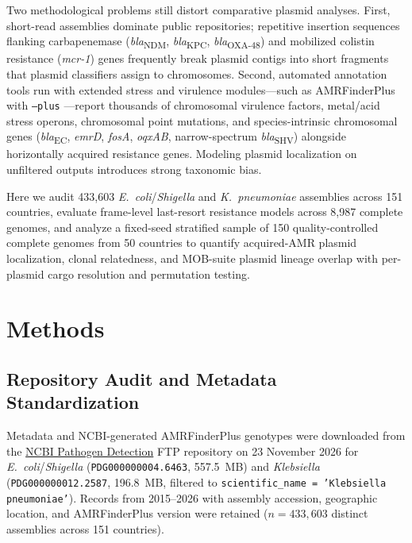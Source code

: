 \documentclass[11pt,a4paper]{article}
\begin{document}
Two methodological problems still distort comparative plasmid analyses. First, short-read assemblies dominate public repositories; repetitive insertion sequences flanking carbapenemase (\textit{bla}\textsubscript{NDM}, \textit{bla}\textsubscript{KPC}, \textit{bla}\textsubscript{OXA-48}) and mobilized colistin resistance (\textit{mcr-1}) genes frequently break plasmid contigs into short fragments that plasmid classifiers assign to chromosomes. Second, automated annotation tools run with extended stress and virulence modules---such as AMRFinderPlus with \texttt{--plus} \cite{feldgarden2021}---report thousands of chromosomal virulence factors, metal/acid stress operons, chromosomal point mutations, and species-intrinsic chromosomal genes (\textit{bla}\textsubscript{EC}, \textit{emrD}, \textit{fosA}, \textit{oqxAB}, narrow-spectrum \textit{bla}\textsubscript{SHV}) alongside horizontally acquired resistance genes. Modeling plasmid localization on unfiltered outputs introduces strong taxonomic bias.

Here we audit 433,603 \textit{E.~coli}/\textit{Shigella} and \textit{K.~pneumoniae} assemblies across 151 countries, evaluate frame-level last-resort resistance models across 8,987 complete genomes, and analyze a fixed-seed stratified sample of 150 quality-controlled complete genomes from 50 countries to quantify acquired-AMR plasmid localization, clonal relatedness, and MOB-suite plasmid lineage overlap with per-plasmid cargo resolution and permutation testing.

\section{Methods}

\subsection{Repository Audit and Metadata Standardization}

Metadata and NCBI-generated AMRFinderPlus genotypes were downloaded from the \href{https://www.ncbi.nlm.nih.gov/pathogens/docs/isolates_gcp}{NCBI Pathogen Detection} FTP repository on 23 November 2026 for \textit{E.~coli}/\textit{Shigella} (\texttt{PDG000000004.6463}, 557.5~MB) and \textit{Klebsiella} (\texttt{PDG000000012.2587}, 196.8~MB, filtered to \texttt{scientific\_name = 'Klebsiella pneumoniae'}). Records from 2015--2026 with assembly accession, geographic location, and AMRFinderPlus version were retained ($n = 433{,}603$ distinct assemblies across 151 countries).
\end{document}
